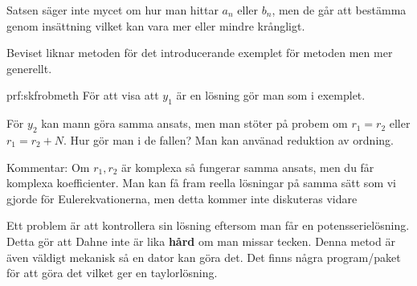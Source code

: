 \par\bigskip
\noindent Satsen säger inte mycet om hur man hittar $a_n$ eller $b_n$, men de går att bestämma genom insättning vilket kan vara mer eller mindre krångligt. 
\par\bigskip
\noindent Beviset liknar metoden för det introducerande exemplet för metoden men mer generellt.
\par\bigskip
\begin{prf}{prf:skfrobmeth}
  För att visa att $y_1$ är en lösning gör man som i exemplet.
  \par
  \noindent För $y_2$ kan mann göra samma ansats, men man stöter på probem om $r_1 = r_2$ eller $r_1=r_2+N$. Hur gör man i de fallen? Man kan använad reduktion av ordning.
  \par\bigskip
  \noindent Kommentar: Om $r_1, r_2$ är komplexa så fungerar samma ansats, men du får  komplexa koefficienter. Man kan få fram reella lösningar på samma sätt som vi gjorde för Eulerekvationerna, men detta kommer inte diskuteras vidare 
\end{prf}
\par\bigskip
\noindent Ett problem är att kontrollera sin lösning eftersom man får en potensserielösning. Detta gör att Dahne inte är lika \textbf{hård} om man missar tecken. Denna metod är även väldigt mekanisk så en dator kan göra det. Det finns några program/paket för att göra det vilket ger en taylorlösning.

